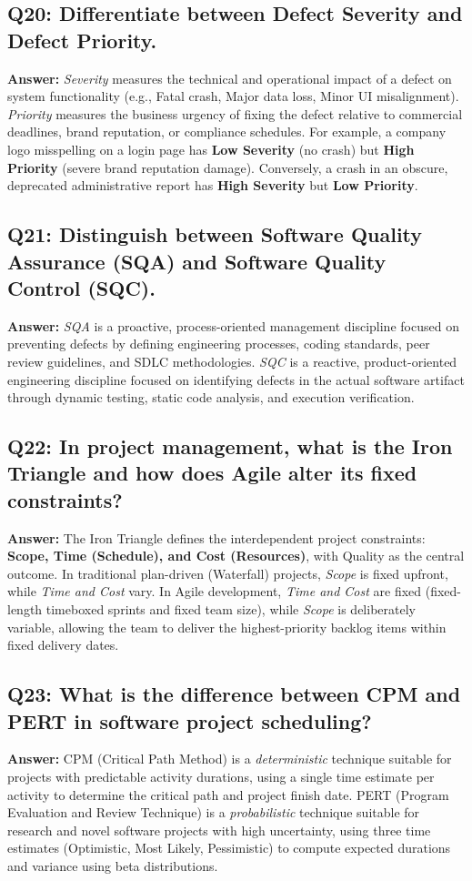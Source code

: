 \subsection*{Q20: Differentiate between Defect Severity and Defect Priority.}
\textbf{Answer:} \textit{Severity} measures the technical and operational impact of a defect on system functionality (e.g., Fatal crash, Major data loss, Minor UI misalignment). \textit{Priority} measures the business urgency of fixing the defect relative to commercial deadlines, brand reputation, or compliance schedules. For example, a company logo misspelling on a login page has \textbf{Low Severity} (no crash) but \textbf{High Priority} (severe brand reputation damage). Conversely, a crash in an obscure, deprecated administrative report has \textbf{High Severity} but \textbf{Low Priority}.

\subsection*{Q21: Distinguish between Software Quality Assurance (SQA) and Software Quality Control (SQC).}
\textbf{Answer:} \textit{SQA} is a proactive, process-oriented management discipline focused on preventing defects by defining engineering processes, coding standards, peer review guidelines, and SDLC methodologies. \textit{SQC} is a reactive, product-oriented engineering discipline focused on identifying defects in the actual software artifact through dynamic testing, static code analysis, and execution verification.

\subsection*{Q22: In project management, what is the Iron Triangle and how does Agile alter its fixed constraints?}
\textbf{Answer:} The Iron Triangle defines the interdependent project constraints: \textbf{Scope, Time (Schedule), and Cost (Resources)}, with Quality as the central outcome. In traditional plan-driven (Waterfall) projects, \textit{Scope} is fixed upfront, while \textit{Time and Cost} vary. In Agile development, \textit{Time and Cost} are fixed (fixed-length timeboxed sprints and fixed team size), while \textit{Scope} is deliberately variable, allowing the team to deliver the highest-priority backlog items within fixed delivery dates.

\subsection*{Q23: What is the difference between CPM and PERT in software project scheduling?}
\textbf{Answer:} CPM (Critical Path Method) is a \textit{deterministic} technique suitable for projects with predictable activity durations, using a single time estimate per activity to determine the critical path and project finish date. PERT (Program Evaluation and Review Technique) is a \textit{probabilistic} technique suitable for research and novel software projects with high uncertainty, using three time estimates (Optimistic, Most Likely, Pessimistic) to compute expected durations and variance using beta distributions.

